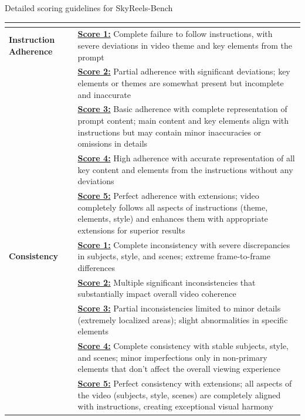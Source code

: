 \documentclass{article}
\begin{document}
Detailed scoring guidelines for SkyReels-Bench
\begin{table}[h]
\centering
\small
\renewcommand{\arraystretch}{1.2}
\setlength{\tabcolsep}{12pt}
\begin{tabular}{>{\raggedright\arraybackslash\bfseries}p{3cm}>{\raggedright\arraybackslash}p{12cm}}
\toprule
\multicolumn{2}{l}{\large\bfseries Evaluation Scoring Guidelines (1-5 scale)} \\
\midrule

 \textbf{Instruction Adherence} & 
\textbf{\underline{Score 1:}} Complete failure to follow instructions, with severe deviations in video theme and key elements from the prompt\\[0.5ex]
& \textbf{\underline{Score 2:}} Partial adherence with significant deviations; key elements or themes are somewhat present but incomplete and inaccurate\\[0.5ex]
& \textbf{\underline{Score 3:}} Basic adherence with complete representation of prompt content; main content and key elements align with instructions but may contain minor inaccuracies or omissions in details\\[0.5ex]
& \textbf{\underline{Score 4:}} High adherence with accurate representation of all key content and elements from the instructions without any deviations\\[0.5ex]
& \textbf{\underline{Score 5:}} Perfect adherence with extensions; video completely follows all aspects of instructions (theme, elements, style) and enhances them with appropriate extensions for superior results\\[1ex]
\midrule

\textbf{Consistency} & 
\textbf{\underline{Score 1:}} Complete inconsistency with severe discrepancies in subjects, style, and scenes; extreme frame-to-frame differences\\[0.5ex]
& \textbf{\underline{Score 2:}} Multiple significant inconsistencies that substantially impact overall video coherence\\[0.5ex]
& \textbf{\underline{Score 3:}} Partial inconsistencies limited to minor details (extremely localized areas); slight abnormalities in specific elements\\[0.5ex]
& \textbf{\underline{Score 4:}} Complete consistency with stable subjects, style, and scenes; minor imperfections only in non-primary elements that don't affect the overall viewing experience\\[0.5ex]
& \textbf{\underline{Score 5:}} Perfect consistency with extensions; all aspects of the video (subjects, style, scenes) are completely aligned with instructions, creating exceptional visual harmony\\[1ex]
\midrule


\end{tabular}
\end{table}
\end{document}
